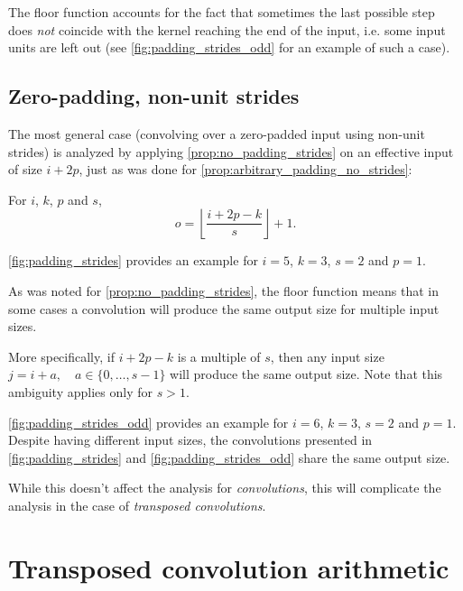 \documentclass{article}
\begin{document}
The floor function accounts for the fact that sometimes the last possible step
does {\em not} coincide with the kernel reaching the end of the input, i.e.
some input units are left out (see \autoref{fig:padding_strides_odd} for an
example of such a case).

\subsection{Zero-padding, non-unit strides}

The most general case (convolving over a zero-padded input using non-unit
strides) is analyzed by applying \autoref{prop:no_padding_strides} on an
effective input of size $i + 2p$, just as was done for
\autoref{prop:arbitrary_padding_no_strides}:

\begin{prop}\label{prop:padding_strides}
For $i$, $k$, $p$ and $s$,
\begin{equation*}
    o = \left\lfloor \frac{i + 2p - k}{s} \right\rfloor + 1.
\end{equation*}
\end{prop}

\autoref{fig:padding_strides} provides an example for $i = 5$, $k = 3$, $s = 2$
and $p = 1$.

As was noted for \autoref{prop:no_padding_strides}, the floor function means
that in some cases a convolution will produce the same output size for multiple
input sizes.

More specifically, if $i + 2p - k$ is a multiple of $s$, then any input size $j
= i + a, \quad a \in \{0,\ldots,s - 1\}$ will produce the same output size. Note
that this ambiguity applies only for $s > 1$.

\autoref{fig:padding_strides_odd} provides an example for $i = 6$, $k = 3$, $s =
2$ and $p = 1$. Despite having different input sizes, the convolutions presented
in \autoref{fig:padding_strides} and \autoref{fig:padding_strides_odd} share the
same output size.

While this doesn't affect the analysis for {\em convolutions}, this will
complicate the analysis in the case of {\em transposed convolutions}.

\section{Transposed convolution arithmetic}
\end{document}
